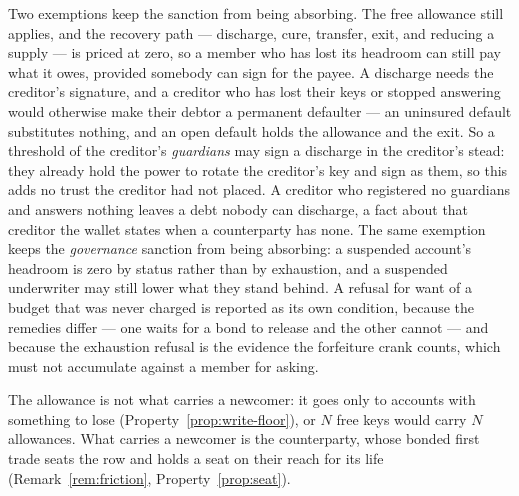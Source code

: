 Two exemptions keep the sanction from being absorbing. The free allowance still applies,
and the recovery path --- discharge, cure, transfer, exit, and reducing a supply --- is
priced at zero, so a member who has lost its headroom can still pay what it owes, provided
somebody can sign for the payee. A discharge needs the creditor's signature, and a creditor
who has lost their keys or stopped answering would otherwise make their debtor a permanent
defaulter --- an uninsured default substitutes nothing, and an open default holds the
allowance and the exit. So a threshold of the creditor's \emph{guardians} may sign a
discharge in the creditor's stead: they already hold the power to rotate the creditor's key
and sign as them, so this adds no trust the creditor had not placed. A creditor who
registered no guardians and answers nothing leaves a debt nobody can discharge, a fact
about that creditor the wallet states when a counterparty has none. The same exemption
keeps the \emph{governance} sanction from being absorbing: a suspended account's headroom
is zero by status rather than by exhaustion, and a suspended underwriter may still lower
what they stand behind. A refusal for want of a budget that was never charged is reported
as its own condition, because the remedies differ --- one waits for a bond to release and
the other cannot --- and because the exhaustion refusal is the evidence the forfeiture
crank counts, which must not accumulate against a member for asking.

The allowance is not what carries a newcomer: it goes only to accounts with something to
lose (Property~\ref{prop:write-floor}), or $N$ free keys would carry $N$ allowances. What
carries a newcomer is the counterparty, whose bonded first trade seats the row and holds a
seat on their reach for its life (Remark~\ref{rem:friction}, Property~\ref{prop:seat}).
